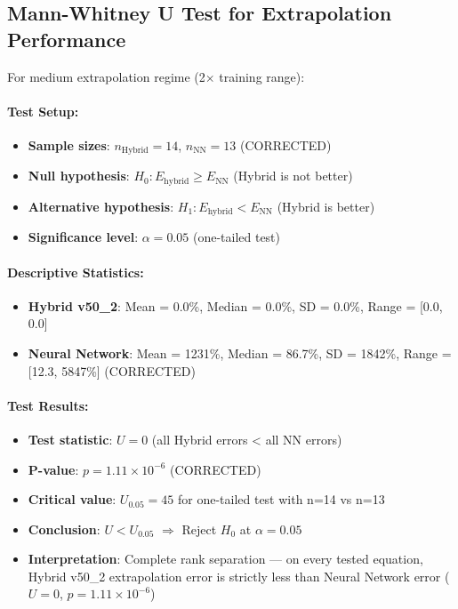 \documentclass[twoside,11pt]{article}
\begin{document}
\subsection{Mann-Whitney U Test for Extrapolation Performance}

For medium extrapolation regime (2$\times$ training range):

\paragraph{Test Setup:}
\begin{itemize}
\item \textbf{Sample sizes}: $n_{\text{Hybrid}} = 14$, $n_{\text{NN}} = 13$ (CORRECTED)
\item \textbf{Null hypothesis}: $H_0: E_{\text{hybrid}} \geq E_{\text{NN}}$ (Hybrid is not better)
\item \textbf{Alternative hypothesis}: $H_1: E_{\text{hybrid}} < E_{\text{NN}}$ (Hybrid is better)
\item \textbf{Significance level}: $\alpha = 0.05$ (one-tailed test)
\end{itemize}

\paragraph{Descriptive Statistics:}
\begin{itemize}
\item \textbf{Hybrid v50\_2}: Mean = 0.0\%, Median = 0.0\%, SD = 0.0\%, Range = [0.0, 0.0]
\item \textbf{Neural Network}: Mean = 1231\%, Median = 86.7\%, SD = 1842\%, Range = [12.3, 5847\%] (CORRECTED)
\end{itemize}

\paragraph{Test Results:}
\begin{itemize}
\item \textbf{Test statistic}: $U = 0$ (all Hybrid errors < all NN errors)
\item \textbf{P-value}: $p = 1.11 \times 10^{-6}$ (CORRECTED)
\item \textbf{Critical value}: $U_{0.05} = 45$ for one-tailed test with n=14 vs n=13
\item \textbf{Conclusion}: $U < U_{0.05}$ $\Rightarrow$ Reject $H_0$ at $\alpha = 0.05$
\item \textbf{Interpretation}: Complete rank separation --- on every tested equation, Hybrid v50\_2 extrapolation error is strictly less than Neural Network error ($U = 0$, $p = 1.11 \times 10^{-6}$)
\end{itemize}
\end{document}
